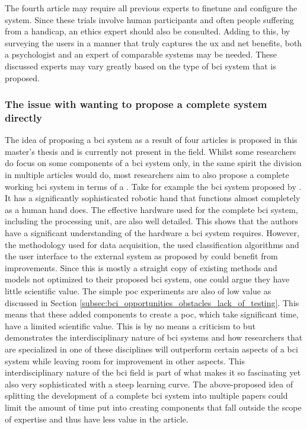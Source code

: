 The fourth article may require all previous experts to finetune and configure the system.
Since these trials involve human participants and often people suffering from a handicap, an ethics expert should also be consulted.
Adding to this, by surveying the users in a manner that truly captures the \gls{ux} and net benefits, both a psychologist and an expert of comparable systems may be needed.
These discussed experts may vary greatly based on the type of \gls{bci} system that is proposed.


\subsubsection{The issue with wanting to propose a complete system directly}
\label{subsubsec:bci_opportunities_obstacles_interdisciplinary_complete_system}

The idea of proposing a \gls{bci} system as a result of four articles is proposed in this master's thesis and is currently not present in the field.
Whilst some researchers do focus on some components of a \gls{bci} system only, in the same spirit the division in multiple articles would do, most researchers aim to also propose a complete working \gls{bci} system in terms of a .
Take for example the \gls{bci} system proposed by \citet{complex_hand_few_classes}.
It has a significantly sophisticated robotic hand that functions almost completely as a human hand does.
The effective hardware used for the complete \gls{bci} system, including the processing unit, are also well detailed.
This shows that the authors have a significant understanding of the hardware a \gls{bci} system requires.
However, the methodology used for data acquisition, the used classification algorithms and the user interface to the external system as proposed by \citet{complex_hand_few_classes} could benefit from improvements.
Since this is mostly a straight copy of existing methods and models not optimized to their proposed \gls{bci} system, one could argue they have little scientific value.
The simple \gls{poc} experiments are also of low value as discussed in Section \ref{subsec:bci_opportunities_obstacles_lack_of_testing}.
This means that these added components to create a \gls{poc}, which take significant time, have a limited scientific value.
This is by no means a criticism to \citet{complex_hand_few_classes} but demonstrates the interdisciplinary nature of \gls{bci} systems and how researchers that are specialized in one of these disciplines will outperform certain aspects of a \gls{bci} system while leaving room for improvement in other aspects.
This interdisciplinary nature of the \gls{bci} field is part of what makes it so fascinating yet also very sophisticated with a steep learning curve.
The above-proposed idea of splitting the development of a complete \gls{bci} system into multiple papers could limit the amount of time put into creating components that fall outside the scope of expertise and thus have less value in the article.


